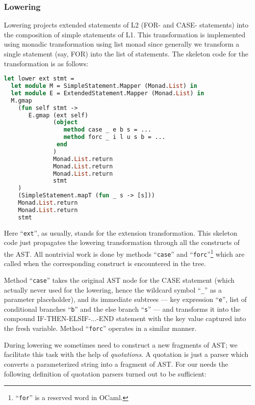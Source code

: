 \subsubsection{Lowering}

Lowering projects extended statements of L2 (FOR- and CASE- statements) into the composition
of simple statements of L1. This transformation is implemented using monadic transformation
using list monad since generally we transform a single statement (say, FOR) into the list
of statements. The skeleton code for the transformation is as follows:

\begin{lstlisting}[language=ocaml]
let lower ext stmt =
  let module M = SimpleStatement.Mapper (Monad.List) in 
  let module E = ExtendedStatement.Mapper (Monad.List) in
  M.gmap 
    (fun self stmt ->
       E.gmap (ext self)
              (object
                 method case _ e b s = ...
                 method forc _ i l u s b = ...
               end
              ) 
              Monad.List.return 
              Monad.List.return 
              Monad.List.return 
              stmt
    )
    (SimpleStatement.mapT (fun _ s -> [s])) 
    Monad.List.return 
    Monad.List.return
    stmt
\end{lstlisting}

Here ``\lstinline{ext}'', as usually, stands for the extension transformation. This skeleton
code just propagates the lowering transformation through all the constructs of the AST. All
nontrivial work is done by methods ``\lstinline{case}'' and 
``\lstinline{forc}''\footnote{``\lstinline{for}'' is a reserved word in OCaml.} which are 
called when the corresponding construct is encountered in the tree.

Method ``\lstinline{case}'' takes the original AST node for the CASE statement 
(which actually never used for the lowering, hence the wildcard symbol ``\lstinline{_}'' 
as a parameter placeholder), and its immediate subtrees --- key expression ``\lstinline{e}'',
list of conditional branches ``\lstinline{b}'' and the else branch ``\lstinline{s}'' --- and transforms it 
into the compound \mbox{IF-THEN-ELSIF-...-END} statement with the key value captured into the fresh variable.
Method ``\lstinline{forc}'' operates in a similar manner.

During lowering we sometimes need to construct a new fragments of AST; we facilitate this task
with the help of \emph{quotations}. A quotation is just a parser which converts a parameterized 
string into a fragment of AST. For our needs the following definition of quotation parsers turned out 
to be sufficient:

